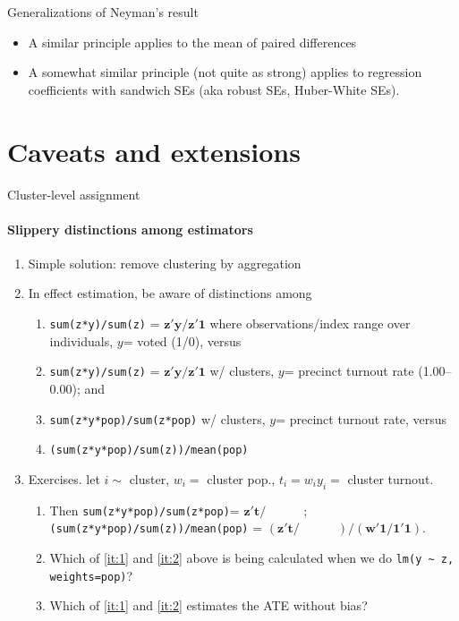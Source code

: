 \begin{frame}{Generalizations of Neyman's result}

  \begin{itemize}
  \item A similar principle applies to the mean of paired differences
  \item A somewhat similar principle (not quite as strong) applies to
    regression coefficients with sandwich SEs (aka robust SEs,
    Huber-White SEs). 
  \end{itemize}
  
\end{frame}
\section{Caveats and extensions}
\begin{frame}{Cluster-level assignment}
\framesubtitle{Slippery distinctions among estimators}
  \begin{enumerate}
  \item Simple solution: remove clustering by aggregation
\item<2-> In effect estimation, be aware of distinctions among
  \begin{enumerate}
    \item \texttt{sum(z*y)/sum(z)} = $\mathbf{z}'\mathbf{y}/\mathbf{z}'\mathbf{1}$  where observations/index range over individuals, $y$= voted (1/0), versus
  \item \texttt{sum(z*y)/sum(z)} = $\mathbf{z}'\mathbf{y}/\mathbf{z}'\mathbf{1}$ w/ clusters,  $y$= precinct turnout rate (1.00--0.00); and 
  \item \texttt{sum(z*y*pop)/sum(z*pop)} w/ clusters, $y$= precinct turnout rate, versus \label{it:1}
  \item \texttt{(sum(z*y*pop)/sum(z))/mean(pop)} \label{it:2}
  \end{enumerate}
\item<3-> Exercises. let $i \sim $ cluster, $w_i =$ cluster pop., $t_i = w_iy_i = $ cluster turnout.
\begin{enumerate}
\item   Then \texttt{sum(z*y*pop)/sum(z*pop)}= $\mathbf{z}'\mathbf{t}/\hspace{3em}$; \texttt{(sum(z*y*pop)/sum(z))/mean(pop)} = $\left(\mathbf{z}'\mathbf{t}/\hspace{3em}\right)/\left(\mathbf{w}'\mathbf{1}/\mathbf{1}'\mathbf{1}\right)$.
  \item Which of \ref{it:1} and \ref{it:2} above is being calculated when we do \texttt{lm(y \textasciitilde\ z, weights=pop)}?
  \item Which of \ref{it:1} and \ref{it:2} estimates the ATE without bias? 
  \end{enumerate}
  \end{enumerate}

\end{frame}

